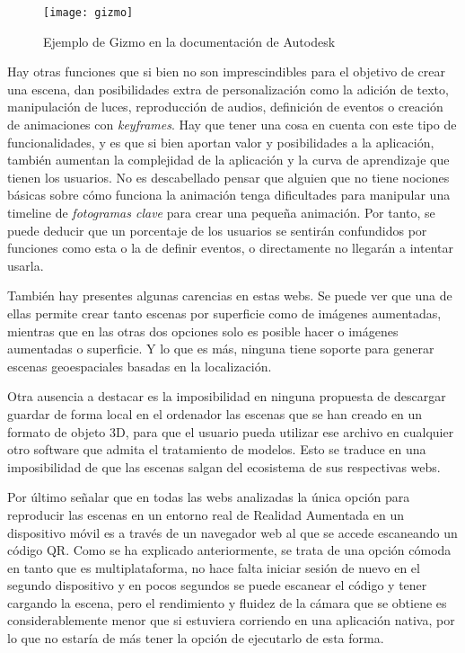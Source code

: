 \begin{figure}[h]
    \centering
    \texttt{[image: gizmo]}
    \caption[Gizmo en Autodesk AutoCAD]{Ejemplo de Gizmo en la documentación de Autodesk}
    \label{fig:gizmo}
\end{figure}

Hay otras funciones que si bien no son imprescindibles para el objetivo de crear una escena, dan posibilidades extra de personalización como la adición de texto, manipulación de luces, reproducción de audios, definición de eventos o creación de animaciones con \textit{keyframes}. Hay que tener una cosa en cuenta con este tipo de funcionalidades, y es que si bien aportan valor y posibilidades a la aplicación, también aumentan la complejidad de la aplicación y la curva de aprendizaje que tienen los usuarios. No es descabellado pensar que alguien que no tiene nociones básicas sobre cómo funciona la animación tenga dificultades para manipular una timeline de \textit{fotogramas clave} para crear una pequeña animación. Por tanto, se puede deducir que un porcentaje de los usuarios se sentirán confundidos por funciones como esta o la de definir eventos, o directamente no llegarán a intentar usarla.

También hay presentes algunas carencias en estas webs. Se puede ver que una de ellas permite crear tanto escenas por superficie como de imágenes aumentadas, mientras que en las otras dos opciones solo es posible hacer o imágenes aumentadas o superficie. Y lo que es más, ninguna tiene soporte para generar escenas geoespaciales basadas en la localización.

Otra ausencia a destacar es la imposibilidad en ninguna propuesta de descargar guardar de forma local en el ordenador las escenas que se han creado en un formato de objeto 3D, para que el usuario pueda utilizar ese archivo en cualquier otro software que admita el tratamiento de modelos. Esto se traduce en una imposibilidad de que las escenas salgan del ecosistema de sus respectivas webs.

Por último señalar que en todas las webs analizadas la única opción para reproducir las escenas en un entorno real de Realidad Aumentada en un dispositivo móvil es a través de un navegador web al que se accede escaneando un código QR. Como se ha explicado anteriormente, se trata de una opción cómoda en tanto que es multiplataforma, no hace falta iniciar sesión de nuevo en el segundo dispositivo y en pocos segundos se puede escanear el código y tener cargando la escena, pero el rendimiento y fluidez de la cámara que se obtiene es considerablemente menor que si estuviera corriendo en una aplicación nativa, por lo que no estaría de más tener la opción de ejecutarlo de esta forma.

